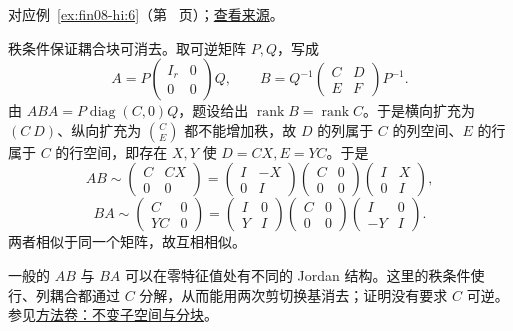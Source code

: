 \documentclass[12pt,fontset=fandol]{ctexart}
\begin{document}
对应例~\ref{ex:fin08-hi:6}（第~\pageref{ex:fin08-hi:6} 页）；\href{https://github.com/lzxcr/cmc-mathematics/blob/64916fa1fdbc3e444a652eca204d5669058ee321/src/problems/finals/08/06.md}{查看来源}。

\begin{solve}

秩条件保证耦合块可消去。取可逆矩阵 $P,Q$，写成
\[
A=P\begin{pmatrix}I_r&0\\0&0\end{pmatrix}Q,\qquad
B=Q^{-1}\begin{pmatrix}C&D\\E&F\end{pmatrix}P^{-1}.
\]
由 $ABA=P\operatorname{diag}(C,0)Q$，题设给出 $\operatorname{rank}B=\operatorname{rank}C$。于是横向扩充为 $(C\ D)$、纵向扩充为 $\binom CE$ 都不能增加秩，故 $D$ 的列属于 $C$ 的列空间、$E$ 的行属于 $C$ 的行空间，即存在 $X,Y$ 使 $D=CX,E=YC$。于是
\[
AB\sim\begin{pmatrix}C&CX\\0&0\end{pmatrix}
=\begin{pmatrix}I&-X\\0&I\end{pmatrix}\begin{pmatrix}C&0\\0&0\end{pmatrix}\begin{pmatrix}I&X\\0&I\end{pmatrix},
\]
\[
BA\sim\begin{pmatrix}C&0\\YC&0\end{pmatrix}
=\begin{pmatrix}I&0\\Y&I\end{pmatrix}\begin{pmatrix}C&0\\0&0\end{pmatrix}\begin{pmatrix}I&0\\-Y&I\end{pmatrix}.
\]
两者相似于同一个矩阵，故互相相似。

\end{solve}

\begin{remark}[方法与条件]

一般的 $AB$ 与 $BA$ 可以在零特征值处有不同的 Jordan 结构。这里的秩条件使行、列耦合都通过 $C$ 分解，从而能用两次剪切换基消去；证明没有要求 $C$ 可逆。参见\hyperref[app:linear-invariant]{方法卷：不变子空间与分块}。

\end{remark}
\end{document}
